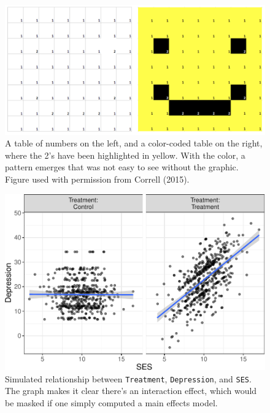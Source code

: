 \documentclass[
  english,
  man]{apa6}
\begin{document}
\begin{figure}
\centering
\includegraphics{images/screenshots/smiley.png}
\caption{A table of numbers on the left, and a color-coded table on the right, where the 2's have been highlighted in yellow. With the color, a pattern emerges that was not easy to see without the graphic. Figure used with permission from Correll (2015).}
\label{fig:smiley}
\end{figure}

\begin{figure}
\centering
\includegraphics{flexplot_psychmeth_files/figure-latex/ses-1.pdf}
\caption{\label{fig:ses}Simulated relationship between \texttt{Treatment}, \texttt{Depression}, and \texttt{SES}. The graph makes it clear there's an interaction effect, which would be masked if one simply computed a main effects model.}
\end{figure}
\end{document}
